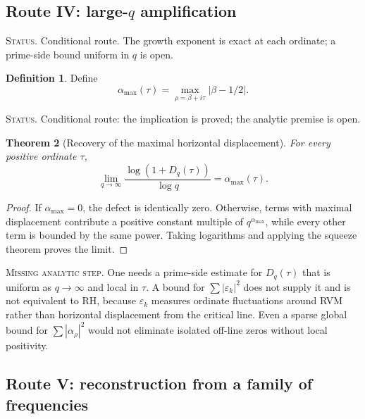 \documentclass[11pt]{amsart}
\numberwithin{equation}{section}
\theoremstyle{plain}
\newtheorem{theorem}{Theorem}[section]
\theoremstyle{definition}
\newtheorem{definition}[theorem]{Definition}
\theoremstyle{remark}
\newcommand{\1}{\mathbf{1}}
\newcommand{\statusnote}[1]{%
  \par\smallskip\noindent
  \begingroup\footnotesize\textsc{Status.} #1\endgroup
  \par\smallskip}
\newcommand{\missingnote}[1]{%
  \par\smallskip\noindent
  \begingroup\footnotesize\textsc{Missing analytic step.} #1\endgroup
  \par\smallskip}
\begin{document}
\subsection{Route IV: large-\texorpdfstring{\(q\)}{q} amplification}
\label{subsec:route_large_q}

\statusnote{Conditional route.  The growth exponent is exact at each ordinate; a prime-side bound uniform in $q$ is open.}
\begin{definition}
\label{def:max_horizontal_displacement}
Define
\begin{equation}
\alpha_{\max}(\tau)
=
\max_{\rho=\beta+i\tau}|\beta-1/2|.
\label{eq:max_horizontal_displacement}
\end{equation}
\end{definition}

\statusnote{Conditional route: the implication is proved; the analytic premise is open.}
\begin{theorem}[Recovery of the maximal horizontal displacement]
\label{thm:large_q_growth_exponent}
For every positive ordinate $\tau$,
\begin{equation}
\lim_{q\to\infty}
\frac{\log(1+D_q(\tau))}{\log q}
=
\alpha_{\max}(\tau).
\label{eq:large_q_growth_exponent}
\end{equation}
\end{theorem}

\begin{proof}
If $\alpha_{\max}=0$, the defect is identically zero.  Otherwise, terms
with maximal displacement contribute a positive constant multiple of
$q^{\alpha_{\max}}$, while every other term is bounded by the same power.
Taking logarithms and applying the squeeze theorem proves the limit.
\end{proof}

\missingnote{One needs a prime-side estimate for $D_q(\tau)$ that is uniform
as $q\to\infty$ and local in $\tau$.  A bound for
$\sum|\varepsilon_k|^2$ does not supply it and is not equivalent to RH,
because $\varepsilon_k$ measures ordinate fluctuations around RVM rather
than horizontal displacement from the critical line.  Even a sparse global
bound for $\sum|\alpha_\rho|^2$ would not eliminate isolated off-line zeros
without local positivity.}

\subsection{Route V: reconstruction from a family of frequencies}
\label{subsec:route_family_q}
\end{document}
